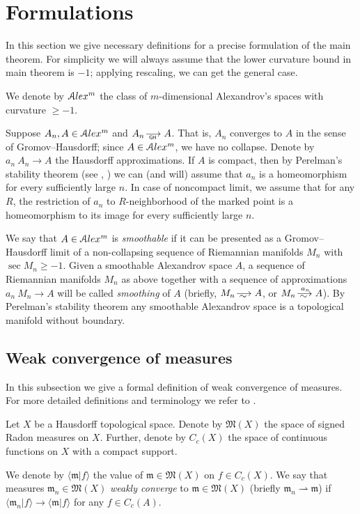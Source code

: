 \section{Formulations}

In this section we give necessary definitions for a precise formulation of the main theorem.
For simplicity  we will always assume that the lower
curvature bound in main theorem is  $-1$;
applying rescaling, we can get the general case.

We denote by
$\mathcal{A}lex^m$ the class of $m$-dimensional Alexandrov's spaces
with curvature $\ge -1$.

Suppose $A_n, A\in \mathcal{A}lex^m$ and $A_n\GHto A$.
That is, $A_n$ converges to 
$A$ in the sense of Gromov--Hausdorff;
since $A\in \mathcal{A}lex^m$, we have no collapse.
Denote by $a_n\:A_n\to A$ the Hausdorff approximations.
If $A$ is compact, then
by Perelman's stability theorem (see \cite{PerStab}, \cite{KapStab}) we can (and will) assume that $a_n$ is a homeomorphism for every sufficiently large $n$.
In case of noncompact limit, we assume that for any $R$, the restriction of $a_n$ to $R$-neighborhood of the marked point is a homeomorphism to its image for every sufficiently large $n$.

We say that $A\in \mathcal{A}lex^m$ is \emph{smoothable}
if it can be presented as a Gromov--Hausdorff limit of a non-collapsing sequence of Riemannian manifolds $M_n$ with $\sec M_n\ge-1$.
Given a smoothable Alexandrov space $A$,
a sequence of Riemannian manifolds $M_n$ as above
together with a sequence of approximations $a_n\:M_n\to A$
will be called \emph{smoothing} of $A$
(briefly, $M_n\smooths{} A$, or $M_n\smooths{a_n} A$).
By Perelman's stability theorem any smoothable Alexandrov space is a topological manifold without boundary.

\subsection{Weak convergence of measures}

In this subsection we give a formal definition of weak convergence of measures.
For more detailed definitions and terminology we refer to
\cite{GMS}.

Let $X$ be a Hausdorff topological space.
Denote by $\mathfrak M(X)$ the space of signed Radon measures on $X$.
Further, denote by $C_c(X)$  the space of continuous functions on $X$
with a compact support. 

We  denote by $\langle \mathfrak m|f\rangle $ the value of $\mathfrak m\in\mathfrak M(X)$ on $f\in C_c(X)$.
We say that measures $\mathfrak m_n\in \mathfrak M(X)$ \emph{weakly converge} to $\mathfrak m\in \mathfrak M(X)$ (briefly
$\mathfrak m_n\rightharpoonup \mathfrak m$) if $\langle \mathfrak m_n|f\rangle \to \langle \mathfrak m|f\rangle $ for any $f\in C_c(A)$.

